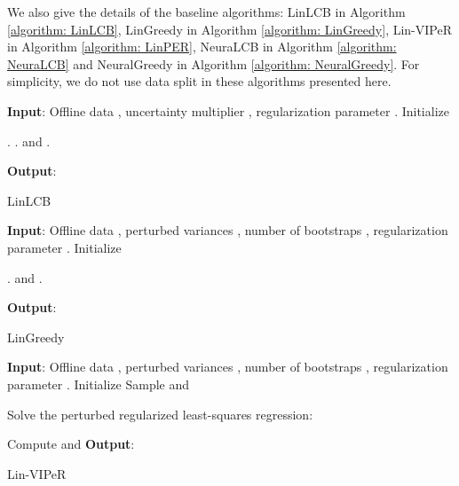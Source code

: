 \documentclass{article} \usepackage{iclr2023/iclr2023_conference,times}
\begin{document}
We also give the details of the baseline algorithms: LinLCB in Algorithm \ref{algorithm: LinLCB}, LinGreedy in Algorithm \ref{algorithm: LinGreedy}, Lin-VIPeR in Algorithm \ref{algorithm: LinPER}, NeuraLCB in Algorithm \ref{algorithm: NeuraLCB} and NeuralGreedy in Algorithm \ref{algorithm: NeuralGreedy}. For simplicity, we do not use data split in these algorithms presented here.  

\begin{algorithm}[h!]
\begin{algorithmic}[1]
\State \textbf{Input}: Offline data , uncertainty multiplier , regularization parameter . 
\State Initialize 
\For{}
\State 


\State 

 \State . 
\label{bpvi:lcb}
\State . 
\State  and .





\EndFor
\State \textbf{Output}: 
\end{algorithmic}
\caption{LinLCB \citep{jin2021pessimism}}
\label{algorithm: LinLCB}
\end{algorithm}

\begin{algorithm}[h!]
\begin{algorithmic}[1]
\State \textbf{Input}: Offline data , perturbed variances , number of bootstraps , regularization parameter . 
\State Initialize 
\For{}


\State 

\label{bpvi:lcb}
\State . 
\State  and .





\EndFor
\State \textbf{Output}: 
\end{algorithmic}
\caption{LinGreedy}
\label{algorithm: LinGreedy}
\end{algorithm}


\begin{algorithm}[h!]
\begin{algorithmic}[1]
\State \textbf{Input}: Offline data , perturbed variances , number of bootstraps , regularization parameter . 
\State Initialize 
\For{}
\State 
\For{}
\State Sample  and 


\State Solve the perturbed regularized least-squares regression: 
\label{RAVI-Lin: perturbed ERM}


\EndFor 

\State Compute 
\State  and 
\EndFor
\State \textbf{Output}: 
\end{algorithmic}
\caption{Lin-VIPeR}
\label{algorithm: LinPER}
\end{algorithm}
\end{document}
